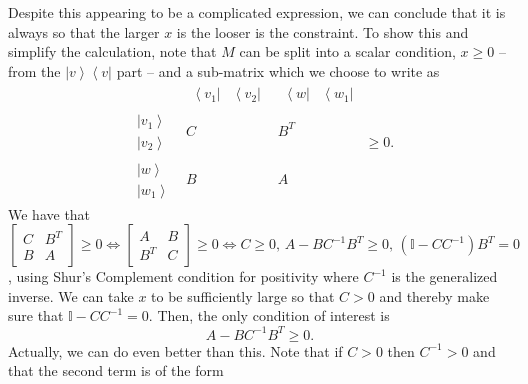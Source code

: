 \documentclass{theoretics}
\begin{document}
Despite this appearing to be a complicated expression, we can conclude
that it is always so that the larger $x$ is the looser is the
constraint. To show this and simplify the calculation, note that
$M$ can be split into a scalar condition, $x\ge0$ -- from the $\left|v\right\rangle \left\langle v\right|$
part -- and a sub-matrix which we choose to write as 
\begin{displaymath}
\begin{array}{c|c|c}
& \begin{array}{cc}
\left\langle v_{1}\right| & \left\langle v_{2}\right|\end{array} & \begin{array}{cc}
\left\langle w\right| & \left\langle w_{1}\right|\end{array}\\
\hline \begin{array}{c}
\left|v_{1}\right\rangle \\
\left|v_{2}\right\rangle 
\end{array} & C & B^{T}\\
\hline \begin{array}{c}
\left|w\right\rangle \\
\left|w_{1}\right\rangle 
\end{array} & B & A
\end{array}\ge0.
\end{displaymath}
We have that $\left[\begin{array}{cc}
C & B^{T}\\
B & A
\end{array}\right]\ge0\iff\left[\begin{array}{cc}
A & B\\
B^{T} & C
\end{array}\right]\ge0\iff C\ge0,\,A-BC^{-1}B^{T}\ge0,\,(\mathbb{I}-CC^{-1})B^{T}=0$, using Shur's Complement condition for positivity where $C^{-1}$
is the generalized inverse. We can take $x$ to be sufficiently large so that $C>0$ and thereby
make sure that $\mathbb{I}-CC^{-1}=0$. Then, the only condition
of interest is 
\begin{displaymath}
A-BC^{-1}B^{T}\ge0.
\end{displaymath}
Actually, we can do even better than this. Note that if $C>0$ then
$C^{-1}>0$ and that the second term is of the form 
\end{document}
